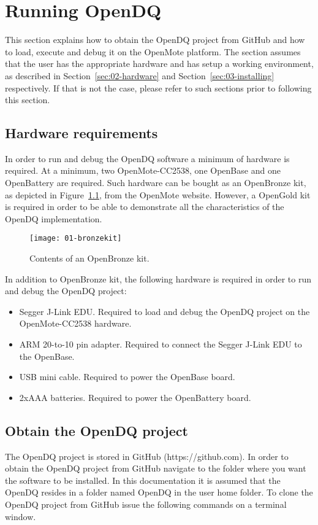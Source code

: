 \chapter{Running OpenDQ}
\label{sec:04-running}
This section explains how to obtain the OpenDQ project from GitHub and how to load, execute and debug it on the OpenMote platform. The section assumes that the user has the appropriate hardware and has setup a working environment, as described in Section~\ref{sec:02-hardware} and Section~\ref{sec:03-installing} respectively. If that is not the case, please refer to such sections prior to following this section.

\section{Hardware requirements}
In order to run and debug the OpenDQ software a minimum of hardware is required. At a minimum, two OpenMote-CC2538, one OpenBase and one OpenBattery are required. Such hardware can be bought as an OpenBronze kit, as depicted in Figure~\ref{fig:openbronze}, from the OpenMote website. However, a OpenGold kit is required in order to be able to demonstrate all the characteristics of the OpenDQ implementation.

\begin{figure}[!it]
    \centering
	\texttt{[image: 01-bronzekit]}
    \caption{Contents of an OpenBronze kit.}
    \label{fig:openbronze}
\end{figure}

In addition to OpenBronze kit, the following hardware is required in order to run and debug the OpenDQ project:
\begin{itemize}
\item Segger J-Link EDU. Required to load and debug the OpenDQ project on the OpenMote-CC2538 hardware.
\item ARM 20-to-10 pin adapter. Required to connect the Segger J-Link EDU to the OpenBase.
\item USB mini cable. Required to power the OpenBase board.
\item 2xAAA batteries. Required to power the OpenBattery board.
\end{itemize}

\section{Obtain the OpenDQ project}
The OpenDQ project is stored in GitHub (https://github.com). In order to obtain the OpenDQ project from GitHub navigate to the folder where you want the software to be installed. In this documentation it is assumed that the OpenDQ resides in a folder named OpenDQ in the user home folder. To clone the OpenDQ project from GitHub issue the following commands on a terminal window.

